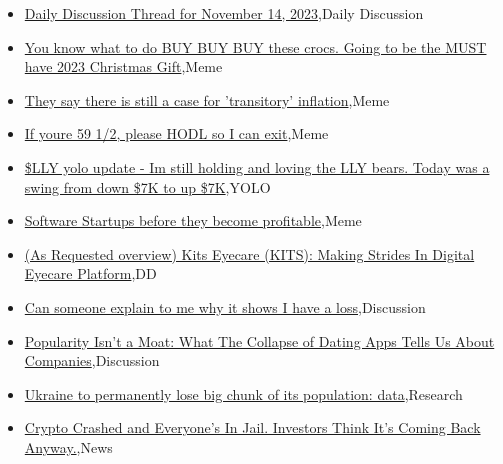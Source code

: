 \documentclass{article}%
\begin{document}
%
\begin{itemize}%
\item%
\href{https://reddit.com/r/wallstreetbets/comments/17uzuu0/daily\_discussion\_thread\_for\_november\_14\_2023/}{Daily Discussion Thread for November 14, 2023},Daily Discussion%
\item%
\href{https://reddit.com/r/wallstreetbets/comments/17utcmg/you\_know\_what\_to\_do\_buy\_buy\_buy\_these\_crocs\_going/}{You know what to do BUY BUY BUY these crocs. Going to be the MUST have 2023 Christmas Gift},Meme%
\item%
\href{https://reddit.com/r/wallstreetbets/comments/17usqu6/they\_say\_there\_is\_still\_a\_case\_for\_transitory/}{They say there is still a case for 'transitory' inflation},Meme%
\item%
\href{https://reddit.com/r/wallstreetbets/comments/17usawm/if\_youre\_59\_12\_please\_hodl\_so\_i\_can\_exit/}{If youre 59 1/2, please HODL so I can exit},Meme%
\item%
\href{https://reddit.com/r/wallstreetbets/comments/17unllo/lly\_yolo\_update\_im\_still\_holding\_and\_loving\_the/}{\$LLY yolo update - Im still holding and loving the LLY bears. Today was a swing from down \$7K to up \$7K},YOLO%
\item%
\href{https://reddit.com/r/wallstreetbets/comments/17ume3h/software\_startups\_before\_they\_become\_profitable/}{Software Startups before they become profitable},Meme%
\item%
\href{https://reddit.com/r/Baystreetbets/comments/17uqp2q/as\_requested\_overview\_kits\_eyecare\_kits\_making/}{(As Requested overview) Kits Eyecare (KITS): Making Strides In Digital Eyecare Platform},DD%
\item%
\href{https://reddit.com/r/StockMarket/comments/17ukdj6/can\_someone\_explain\_to\_me\_why\_it\_shows\_i\_have\_a/}{Can someone explain to me why it shows I have a loss},Discussion%
\item%
\href{https://reddit.com/r/StockMarket/comments/17ugaus/popularity\_isnt\_a\_moat\_what\_the\_collapse\_of/}{Popularity Isn't a Moat: What The Collapse of Dating Apps Tells Us About Companies},Discussion%
\item%
\href{https://reddit.com/r/Economics/comments/17ux2h2/ukraine\_to\_permanently\_lose\_big\_chunk\_of\_its/}{Ukraine to permanently lose big chunk of its population: data},Research%
\item%
\href{https://reddit.com/r/Economics/comments/17uwzun/crypto\_crashed\_and\_everyones\_in\_jail\_investors/}{Crypto Crashed and Everyone's In Jail. Investors Think It's Coming Back Anyway.},News%
\end{itemize}%
\end{document}
